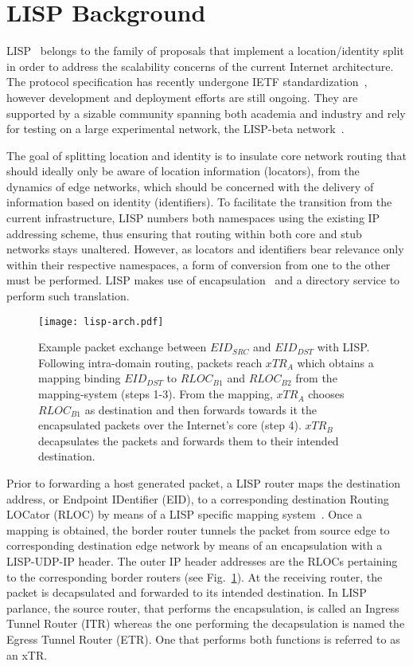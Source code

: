 \documentclass[twocolumn, 10pt]{article}
\theoremstyle{plain}
\begin{document}
\section{LISP Background}\label{sec:background}
LISP~\cite{saucez:lisp} belongs to the family of proposals that implement
a location/identity split in order to address the scalability concerns of the
current Internet architecture. The protocol specification has recently
undergone IETF standardization~\cite{rfc6830}, however development and
deployment efforts are still ongoing. They are supported by a sizable
community spanning both academia and industry and rely for testing on a large
experimental network, the LISP-beta network~\cite{lisp:testbed}. 

The goal of splitting location and identity is to insulate core network
routing that should ideally only be aware of location information (locators),
from the dynamics of edge networks, which should be concerned with the delivery of
information based on identity (identifiers). To facilitate the transition from the current
infrastructure, LISP numbers both namespaces using the existing IP addressing
scheme, thus ensuring that routing within both core and stub networks stays unaltered.
However, as locators and identifiers bear relevance only within their
respective namespaces, a form of conversion from one to the other must be
performed. LISP makes use of encapsulation~\cite{rfc1955} and a directory
service to perform such translation.

\begin{figure}[t]
    \centering
    \texttt{[image: lisp-arch.pdf]}
    \caption{Example packet exchange between $EID_{SRC}$ and $EID_{DST}$ with
    LISP. Following intra-domain routing, packets reach $xTR_{A}$ which
    obtains a mapping binding $EID_{DST}$ to $RLOC_{B1}$ and $RLOC_{B2}$ from the mapping-system
    (steps 1-3). From the mapping, $xTR_{A}$ chooses $RLOC_{B1}$ as destination
    and then forwards towards it the encapsulated packets over the Internet's
    core (step 4). $xTR_{B}$ decapsulates the packets and forwards them to their
    intended destination. }
    \label{fig:lisp-arch}
\end{figure}

Prior to forwarding a host generated packet, a LISP router maps the
destination address, or Endpoint IDentifier (EID), to a corresponding
destination Routing LOCator (RLOC) by means of a LISP specific mapping
system~\cite{draft:lisp-ddt,jakab:lisp-tree}.  Once a mapping
is obtained, the border router tunnels the packet from source edge to
corresponding destination edge network by means of an encapsulation with a
LISP-UDP-IP header. The outer IP header addresses are the RLOCs pertaining to
the corresponding border routers (see Fig.~\ref{fig:lisp-arch}). At the
receiving router, the packet is decapsulated and forwarded to its intended
destination. In LISP parlance, the source router, that performs the
encapsulation, is called an Ingress Tunnel Router (ITR) whereas the one
performing the decapsulation is named the Egress Tunnel Router (ETR). One that
performs both functions is referred to as an xTR. 
\end{document}
